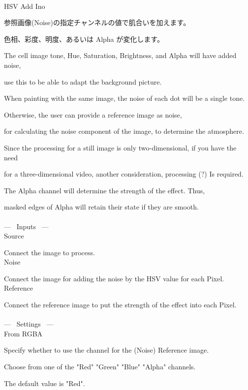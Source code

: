\documentclass[a4paper,12pt]{article}
\begin{document}
\thispagestyle{empty}

\Large
\noindent \\
HSV Add Ino\medskip
\par
\normalsize
参照画像(Noise)の指定チャンネルの値で肌合いを加えます。\par
色相、彩度、明度、あるいは Alpha が変化します。\\
\par
The cell image tone, Hue, Saturation, Brightness, and Alpha will have added noise,\par
use this to be able to adapt the background picture.\par
When painting with the same image, the noise of each dot will be a single tone.\par
Otherwise, the user can provide a reference image as noise,\par
for calculating the noise component of the image, to determine the atmosphere.
\\
\par
Since the processing for a still image is only two-dimensional, if you have the need\par
for a three-dimensional video, another consideration, processing (?) Is required.\\
\par
The Alpha channel will determine the strength of the effect. Thus,\par
masked edges of Alpha will retain their state if they are smooth.\\
\\
--- \ Inputs \ ---\\
Source\par
Connect the image to process.\\
Noise\par
Connect the image for adding the noise by the HSV value for each Pixel.\\
Reference\par
Connect the reference image to put the strength of the effect into each Pixel.\\
\\
--- \ Settings \ ---\\
From RGBA\par
Specify whether to use the channel for the (Noise) Reference image.\par
Choose from one of the "Red" "Green" "Blue" "Alpha" channels.\par
The default value is "Red".\\
\\
\end{document}
